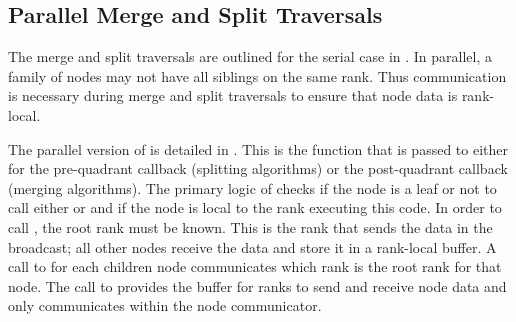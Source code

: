 
\subsection{Parallel Merge and Split Traversals}

The merge and split traversals are outlined for the serial case in . In parallel, a family of nodes may not have all siblings on the same rank. Thus communication is necessary during merge and split traversals to ensure that node data is rank-local.

The parallel version of  is detailed in . This is the function that is passed to  either for the pre-quadrant callback (splitting algorithms) or the post-quadrant callback (merging algorithms). The primary logic of  checks if the node is a leaf or not to call either  or  and if the node is local to the rank executing this code. In order to call , the root rank must be known. This is the rank that sends the data in the broadcast; all other nodes receive the data and store it in a rank-local buffer. A call to  for each children node communicates which rank is the root rank for that node. The call to  provides the buffer for ranks to send and receive node data and only communicates within the node communicator.

